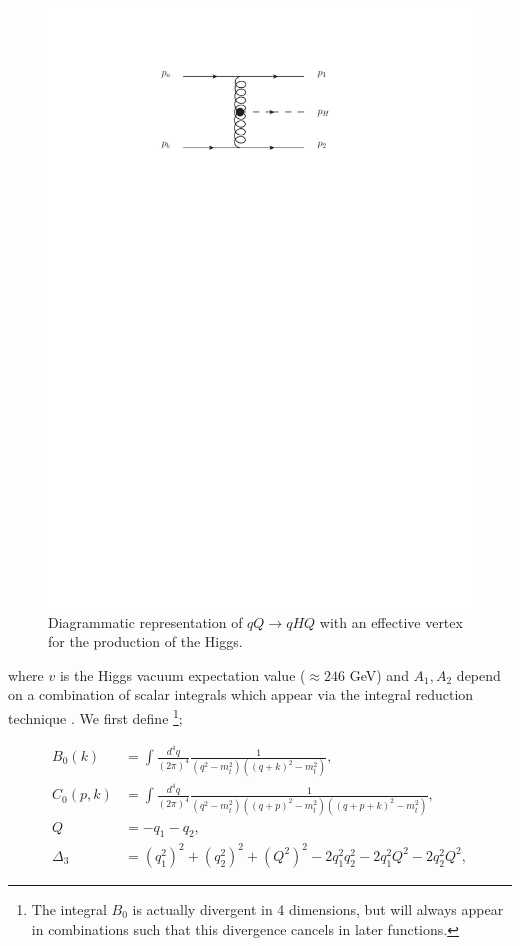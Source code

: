 \begin{figure}[t]
\centering
\includegraphics{Images/qQh_eff.pdf}
\caption{Diagrammatic representation of $qQ \to qHQ$ with an effective vertex for the production of the Higgs.}
\label{fig:qQh_eff}
\end{figure}

where $v$ is the Higgs vacuum expectation value ($\approx 246$ GeV) and $A_1, A_2$ depend on a combination of scalar integrals which appear via the integral reduction technique \cite{Tkachov:1981}. We first define \footnote{The integral $B_0$ is actually divergent in 4 dimensions, but will always appear in combinations such that this divergence cancels in later functions.};

\begin{equation}
\begin{split}
B_0(k) &= \int \frac{d^4 q}{(2 \pi)^4} \frac{1}{(q^2-m_t^2)((q+k)^2-m_t^2)}, \\
C_0(p,k) &= \int \frac{d^4 q}{(2 \pi)^4} \frac{1}{(q^2-m_t^2)((q+p)^2-m_t^2)((q+p+k)^2-m_t^2)}, \\
Q &= -q_1 - q_2, \\
\Delta_3 &= (q_1^2)^2 + (q_2^2)^2 + (Q^2)^2 - 2 q_1^2 q_2^2 - 2q_1^2Q^2 - 2q_2^2Q^2,
\end{split}
\label{eqn:scalars}
\end{equation}

